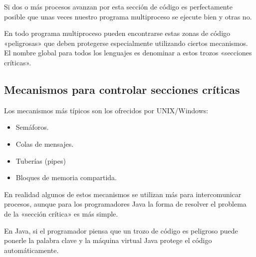 \documentclass[letterpaper,10pt,spanish]{sphinxmanual}
\begin{document}
Si dos o más procesos avanzan por esta sección de código es perfectamente posible que unas veces nuestro programa multiproceso se ejecute bien y otras no.

En todo programa multiproceso pueden encontrarse estas zonas de código «peligrosas» que deben protegerse especialmente utilizando ciertos mecanismos. El nombre global para todos los lenguajes es denominar a estos trozos «secciones críticas».


\subsection{Mecanismos para controlar secciones críticas}
\label{\detokenize{textos/tema1:mecanismos-para-controlar-secciones-criticas}}
Los mecanismos más típicos son los ofrecidos por UNIX/Windows:
\begin{itemize}
\item {} 
Semáforos.

\item {} 
Colas de mensajes.

\item {} 
Tuberías (pipes)

\item {} 
Bloques de memoria compartida.

\end{itemize}

En realidad algunos de estos mecanismos se utilizan más para intercomunicar procesos, aunque para los programadores Java la forma de resolver el problema de la «sección crítica» es más simple.

En Java, si el programador piensa que un trozo de código es peligroso puede ponerle la palabra clave  y la máquina virtual Java protege el código automáticamente.

%
\begin{sphinxVerbatim}[commandchars=\\\{\}]
               


        
             
\end{sphinxVerbatim}
\end{document}
